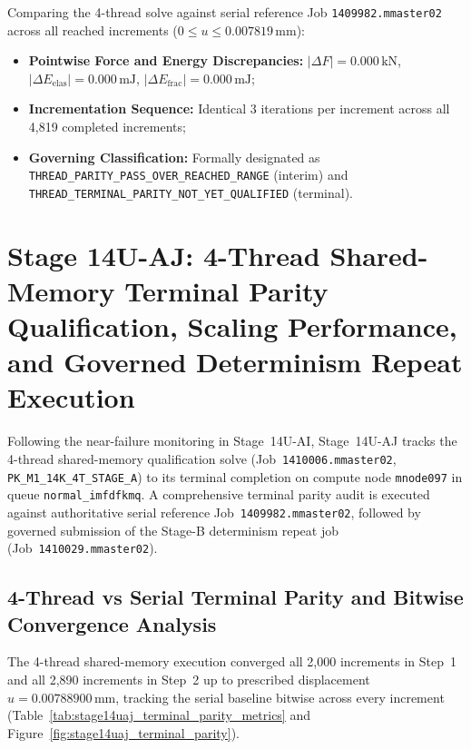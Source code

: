 Comparing the 4-thread solve against serial reference Job \texttt{1409982.mmaster02} across all reached increments ($0 \le u \le 0.007819\,\mathrm{mm}$):
\begin{itemize}
  \item \textbf{Pointwise Force and Energy Discrepancies:} $|\Delta F| = 0.000\,\mathrm{kN}$, $|\Delta E_{\mathrm{elas}}| = 0.000\,\mathrm{mJ}$, $|\Delta E_{\mathrm{frac}}| = 0.000\,\mathrm{mJ}$;
  \item \textbf{Incrementation Sequence:} Identical 3 iterations per increment across all 4,819 completed increments;
  \item \textbf{Governing Classification:} Formally designated as \texttt{THREAD\_PARITY\_PASS\_OVER\_REACHED\_RANGE} (interim) and \texttt{THREAD\_TERMINAL\_PARITY\_NOT\_YET\_QUALIFIED} (terminal).
\end{itemize}

\section{Stage 14U-AJ: 4-Thread Shared-Memory Terminal Parity Qualification, Scaling Performance, and Governed Determinism Repeat Execution}
\label{sec:stage14uaj_terminal_parity_and_determinism}

Following the near-failure monitoring in Stage~14U-AI, Stage~14U-AJ tracks the 4-thread shared-memory qualification solve (Job~\texttt{1410006.mmaster02}, \texttt{PK\_M1\_14K\_4T\_STAGE\_A}) to its terminal completion on compute node \texttt{mnode097} in queue \texttt{normal\_imfdfkmq}. A comprehensive terminal parity audit is executed against authoritative serial reference Job~\texttt{1409982.mmaster02}, followed by governed submission of the Stage-B determinism repeat job (Job~\texttt{1410029.mmaster02}).

\subsection{4-Thread vs Serial Terminal Parity and Bitwise Convergence Analysis}
\label{subsec:stage14uaj_terminal_parity}

The 4-thread shared-memory execution converged all 2,000 increments in Step~1 and all 2,890 increments in Step~2 up to prescribed displacement $u = 0.00788900\,\mathrm{mm}$, tracking the serial baseline bitwise across every increment (Table~\ref{tab:stage14uaj_terminal_parity_metrics} and Figure~\ref{fig:stage14uaj_terminal_parity}).

